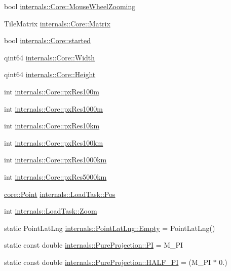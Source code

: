 \begin{DoxyCompactItemize}
\item 
bool \hyperlink{group___o_p_map_widget_ga051b1520271b875b55fa1023041a16e6}{internals\-::\-Core\-::\-Mouse\-Wheel\-Zooming}
\item 
\-Tile\-Matrix \hyperlink{group___o_p_map_widget_ga4ac91c5f728a51e821a9cec0abf347fd}{internals\-::\-Core\-::\-Matrix}
\item 
bool \hyperlink{group___o_p_map_widget_ga797e80c1349c656593de207aa74935de}{internals\-::\-Core\-::started}
\item 
qint64 \hyperlink{group___o_p_map_widget_ga3d5e76b481e1832dff58d33176b6a158}{internals\-::\-Core\-::\-Width}
\item 
qint64 \hyperlink{group___o_p_map_widget_ga9a5a3c48699aba8ef9582514fca243f0}{internals\-::\-Core\-::\-Height}
\item 
int \hyperlink{group___o_p_map_widget_ga0f93533bcdd67093c6da41e069997291}{internals\-::\-Core\-::px\-Res100m}
\item 
int \hyperlink{group___o_p_map_widget_gaa0947582a08d181d668db653fa4ed991}{internals\-::\-Core\-::px\-Res1000m}
\item 
int \hyperlink{group___o_p_map_widget_gaff97208acbd79e92f35d678a5651d063}{internals\-::\-Core\-::px\-Res10km}
\item 
int \hyperlink{group___o_p_map_widget_gab81b3e64348e0d02e67bd4f7350656cc}{internals\-::\-Core\-::px\-Res100km}
\item 
int \hyperlink{group___o_p_map_widget_ga5abde0bbaaa9517978da18398333e69b}{internals\-::\-Core\-::px\-Res1000km}
\item 
int \hyperlink{group___o_p_map_widget_gaed5c41c8c2b585074948d5918ae1a480}{internals\-::\-Core\-::px\-Res5000km}
\item 
\hyperlink{structcore_1_1_point}{core\-::\-Point} \hyperlink{group___o_p_map_widget_gaaaf77679e16ef9213c85fbfaff467339}{internals\-::\-Load\-Task\-::\-Pos}
\item 
int \hyperlink{group___o_p_map_widget_gaee096bc3882220e2ed2b8b167cecb9ad}{internals\-::\-Load\-Task\-::\-Zoom}
\item 
static \-Point\-Lat\-Lng \hyperlink{group___o_p_map_widget_gac62d167bf1e7f0374f7e536e64320c13}{internals\-::\-Point\-Lat\-Lng\-::\-Empty} = \-Point\-Lat\-Lng()
\item 
static const double \hyperlink{group___o_p_map_widget_gaab58a4dd2b2aec1a140df479c3da07c5}{internals\-::\-Pure\-Projection\-::\-P\-I} = \-M\-\_\-\-P\-I
\item 
static const double \hyperlink{group___o_p_map_widget_ga767800d1664d3a7d0255a1d1d55bea69}{internals\-::\-Pure\-Projection\-::\-H\-A\-L\-F\-\_\-\-P\-I} = (\-M\-\_\-\-P\-I $\ast$ 0.)

\end{DoxyCompactItemize}
